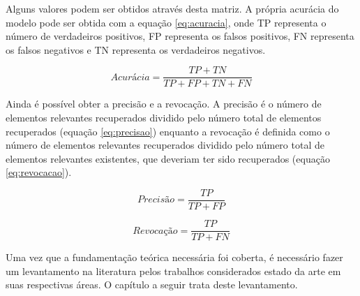 Alguns valores podem ser obtidos através desta matriz. A própria acurácia do modelo pode ser obtida com a equação \ref{eq:acuracia}, onde TP representa o número de verdadeiros positivos, FP representa os falsos positivos, FN representa os falsos negativos e TN representa os verdadeiros negativos.

\begin{equation}
  Acurácia = \frac{TP+TN}{TP+FP+TN+FN}
\label{eq:acuracia}
\end{equation}

Ainda é possível obter a precisão e a revocação. A precisão é o número de elementos relevantes recuperados dividido pelo número total de elementos recuperados (equação \ref{eq:precisao}) enquanto a revocação é definida como o número de elementos relevantes recuperados dividido pelo número total de elementos relevantes existentes, que deveriam ter sido recuperados (equação \ref{eq:revocacao}).

\begin{equation}
  Precisão = \frac{TP}{TP+FP}
\label{eq:precisao}
\end{equation}


\begin{equation}
  Revocação = \frac{TP}{TP+FN}
\label{eq:revocacao}
\end{equation}

Uma vez que a fundamentação teórica necessária foi coberta, é necessário fazer um levantamento na literatura pelos trabalhos considerados estado da arte em suas respectivas áreas. O capítulo a seguir trata deste levantamento.